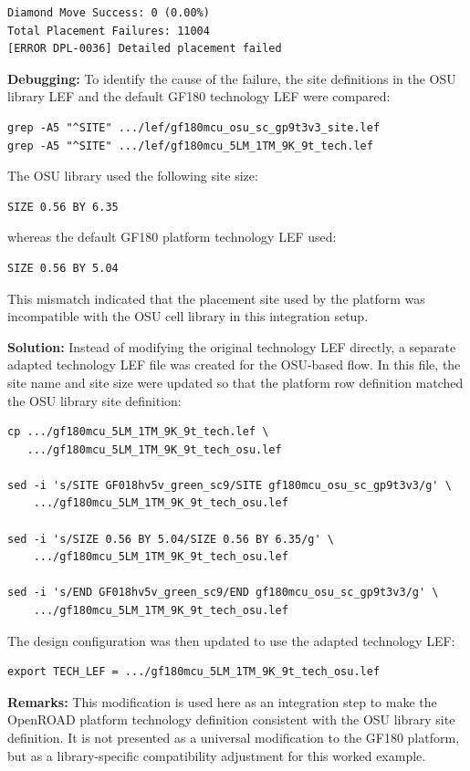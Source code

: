\documentclass[11pt]{article}
\begin{document}
\begin{lstlisting}
Diamond Move Success: 0 (0.00%)
Total Placement Failures: 11004
[ERROR DPL-0036] Detailed placement failed
\end{lstlisting}

\textbf{Debugging:}  
To identify the cause of the failure, the site definitions in the OSU library LEF and the default GF180 technology LEF were compared:

\begin{lstlisting}
grep -A5 "^SITE" .../lef/gf180mcu_osu_sc_gp9t3v3_site.lef
grep -A5 "^SITE" .../lef/gf180mcu_5LM_1TM_9K_9t_tech.lef
\end{lstlisting}

The OSU library used the following site size:

\begin{lstlisting}
SIZE 0.56 BY 6.35
\end{lstlisting}

whereas the default GF180 platform technology LEF used:

\begin{lstlisting}
SIZE 0.56 BY 5.04
\end{lstlisting}

This mismatch indicated that the placement site used by the platform was incompatible with the OSU cell library in this integration setup.

\textbf{Solution:}  
Instead of modifying the original technology LEF directly, a separate adapted technology LEF file was created for the OSU-based flow. In this file, the site name and site size were updated so that the platform row definition matched the OSU library site definition:

\begin{lstlisting}
cp .../gf180mcu_5LM_1TM_9K_9t_tech.lef \
   .../gf180mcu_5LM_1TM_9K_9t_tech_osu.lef

sed -i 's/SITE GF018hv5v_green_sc9/SITE gf180mcu_osu_sc_gp9t3v3/g' \
    .../gf180mcu_5LM_1TM_9K_9t_tech_osu.lef

sed -i 's/SIZE 0.56 BY 5.04/SIZE 0.56 BY 6.35/g' \
    .../gf180mcu_5LM_1TM_9K_9t_tech_osu.lef

sed -i 's/END GF018hv5v_green_sc9/END gf180mcu_osu_sc_gp9t3v3/g' \
    .../gf180mcu_5LM_1TM_9K_9t_tech_osu.lef
\end{lstlisting}

The design configuration was then updated to use the adapted technology LEF:

\begin{lstlisting}
export TECH_LEF = .../gf180mcu_5LM_1TM_9K_9t_tech_osu.lef
\end{lstlisting}

\textbf{Remarks:}  
This modification is used here as an integration step to make the OpenROAD platform technology definition consistent with the OSU library site definition. It is not presented as a universal modification to the GF180 platform, but as a library-specific compatibility adjustment for this worked example.



\end{document}

